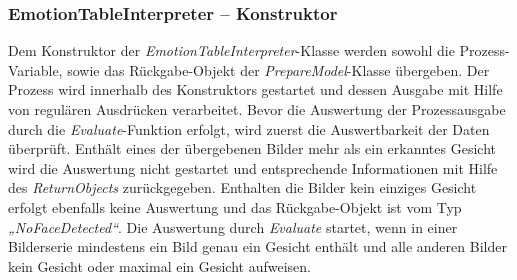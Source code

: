 \documentclass[10pt,a4paper]{report}
\begin{document}
\subsubsection{EmotionTableInterpreter – Konstruktor}
Dem Konstruktor der \textit{EmotionTableInterpreter}-Klasse werden sowohl die Prozess-Variable, sowie das R\"{u}ckgabe-Objekt der \textit{PrepareModel}-Klasse \"{u}bergeben. Der Prozess wird innerhalb des Konstruktors gestartet und dessen Ausgabe mit Hilfe von regul\"{a}ren Ausdr\"{u}cken verarbeitet. Bevor die Auswertung der Prozessausgabe durch die \textit{Evaluate}-Funktion erfolgt, wird zuerst die Auswertbarkeit der Daten \"{u}berpr\"{u}ft. Enth\"{a}lt eines der \"{u}bergebenen Bilder mehr als ein erkanntes Gesicht wird die Auswertung nicht gestartet und entsprechende Informationen mit Hilfe des \textit{ReturnObjects} zur\"{u}ckgegeben. Enthalten die Bilder kein einziges Gesicht erfolgt ebenfalls keine Auswertung und das R\"{u}ckgabe-Objekt ist vom Typ \textit{„NoFaceDetected“}. Die Auswertung durch \textit{Evaluate} startet, wenn in einer Bilderserie mindestens ein Bild genau ein Gesicht enth\"{a}lt und alle anderen Bilder kein Gesicht oder maximal ein Gesicht aufweisen.
\end{document}
